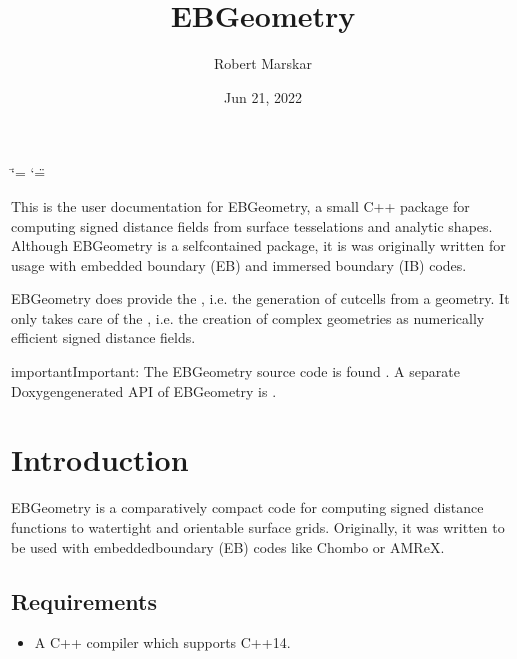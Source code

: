 \documentclass[letterpaper,10pt,english]{sphinxmanual}
\title{EBGeometry}
\date{Jun 21, 2022}
\author{Robert Marskar}
\begin{document}
\ifdefined\shorthandoff
  \ifnum\catcode`\=\string=\active\shorthandoff{=}\fi
  \ifnum\catcode`\"=\active{}\fi
\fi

\pagestyle{empty}
\sphinxmaketitle
\pagestyle{plain}
\sphinxtableofcontents
\pagestyle{normal}
\label{\detokenize{index::doc}}


\sphinxAtStartPar
This is the user documentation for EBGeometry, a small C++ package for computing signed distance fields from surface tesselations and analytic shapes.
Although EBGeometry is a self\sphinxhyphen{}contained package, it is was originally written for usage with embedded boundary (EB) and immersed boundary (IB) codes.

\sphinxAtStartPar
EBGeometry does provide the , i.e. the generation of cut\sphinxhyphen{}cells from a geometry.
It only takes care of the , i.e. the creation of complex geometries as numerically efficient signed distance fields.

\begin{sphinxadmonition}{important}{Important:}
\sphinxAtStartPar
The EBGeometry source code is found .
A separate Doxygen\sphinxhyphen{}generated API of EBGeometry is .
\end{sphinxadmonition}




\chapter{Introduction}
\label{\detokenize{index:introduction}}
\sphinxstepscope
{}\label{\detokenize{Introduction:chap-introduction}}
\sphinxAtStartPar
EBGeometry is a comparatively compact code for computing signed distance functions to watertight and orientable surface grids.
Originally, it was written to be used with embedded\sphinxhyphen{}boundary (EB) codes like Chombo or AMReX.


\section{Requirements}
\label{\detokenize{Introduction:requirements}}\label{\detokenize{Introduction::doc}}\begin{itemize}
\item {} 
\sphinxAtStartPar
A C++ compiler which supports C++14.

\end{itemize}
\end{document}
